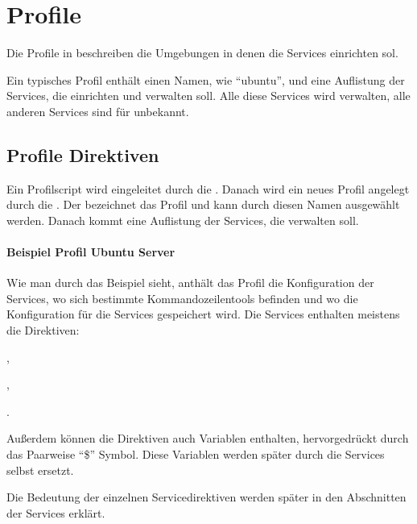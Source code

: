 \section{Profile}

\begin{multicols}{2}

Die Profile in \sscontrol{} beschreiben die Umgebungen in denen \sscontrol{} die
Services einrichten sol.

Ein typisches Profil enthält einen Namen, wie ``ubuntu'', und eine Auflistung
der Services, die \sscontrol{} einrichten und verwalten soll. Alle diese
Services wird \sscontrol{} verwalten, alle anderen Services sind für
\sscontrol{} unbekannt.

\end{multicols}

\subsection{Profile Direktiven}

\begin{multicols}{2}

Ein Profilscript wird eingeleitet durch die .
Danach wird ein neues Profil angelegt durch die
. Der  bezeichnet das Profil
und kann durch diesen Namen ausgewählt werden. Danach kommt eine Auflistung der
Services, die \sscontrol{} verwalten soll.

\paragraph{Beispiel Profil Ubuntu Server}

Wie man durch das Beispiel sieht, anthält das Profil die Konfiguration der
Services, wo sich bestimmte Kommandozeilentools befinden und wo die
Konfiguration für die Services gespeichert wird. Die Services enthalten meistens
die Direktiven:
\begin{inparaitem}
\item {},
\item {},
\item {}
\end{inparaitem}. 

Außerdem können die Direktiven auch Variablen enthalten, hervorgedrückt durch
das Paarweise ``\$'' Symbol. Diese Variablen werden später durch die Services
selbst ersetzt.

Die Bedeutung der einzelnen Servicedirektiven werden später in den Abschnitten
der Services erklärt.

\end{multicols}


